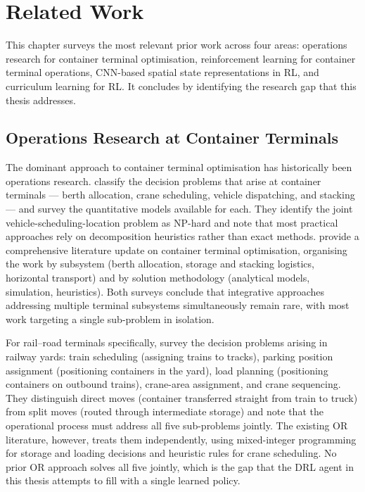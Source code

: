 \chapter{Related Work}
\label{ch:related}

This chapter surveys the most relevant prior work across four areas: operations research for container terminal optimisation, reinforcement learning for container terminal operations, CNN-based spatial state representations in RL, and curriculum learning for RL. It concludes by identifying the research gap that this thesis addresses.

\section{Operations Research at Container Terminals}
\label{sec:rw:or}

The dominant approach to container terminal optimisation has historically been operations research. \textcite{vis2003transshipment} classify the decision problems that arise at container terminals --- berth allocation, crane scheduling, vehicle dispatching, and stacking --- and survey the quantitative models available for each. They identify the joint vehicle-scheduling-location problem as NP-hard \cite{bish2001dispatching} and note that most practical approaches rely on decomposition heuristics rather than exact methods. \textcite{stahlbock2008operations} provide a comprehensive literature update on container terminal optimisation, organising the work by subsystem (berth allocation, storage and stacking logistics, horizontal transport) and by solution methodology (analytical models, simulation, heuristics). Both surveys conclude that integrative approaches addressing multiple terminal subsystems simultaneously remain rare, with most work targeting a single sub-problem in isolation.

For rail--road terminals specifically, \textcite{boysen2013container} survey the decision problems arising in railway yards: train scheduling (assigning trains to tracks), parking position assignment (positioning containers in the yard), load planning (positioning containers on outbound trains), crane-area assignment, and crane sequencing. They distinguish direct moves (container transferred straight from train to truck) from split moves (routed through intermediate storage) and note that the operational process must address all five sub-problems jointly. The existing OR literature, however, treats them independently, using mixed-integer programming for storage and loading decisions and heuristic rules for crane scheduling. No prior OR approach solves all five jointly, which is the gap that the DRL agent in this thesis attempts to fill with a single learned policy.

